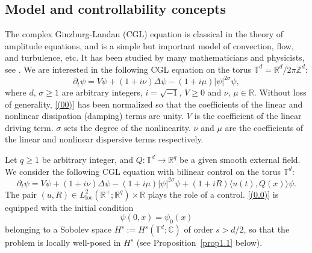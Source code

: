 \documentclass[review]{elsarticle}
\theoremstyle{dotless}
\def\R {\mathbb{R}}
\def \geq{\geqslant}
\numberwithin{equation}{section}
\begin{document}
\subsection{Model and controllability concepts}
The complex Ginzburg-Landau (CGL) equation is classical in the theory of amplitude equations, and is a simple but important model of convection, flow, and turbulence, etc. It has been studied by many mathematicians and physicists, see \cite{GL,NewellWhitehead,Segel,SteStu}.
We are interested in the following CGL equation  on the torus $\mathbb{T}^d=\mathbb{R}^d / 2 \pi \mathbb{Z}^d$:
\begin{equation}\label{(00)}
\partial_t \psi=V \psi+(1+i \nu) \Delta \psi-(1+i \mu)|\psi|^{2 \sigma} \psi,
\end{equation}where $d,\, \sigma \geq 1$ are arbitrary integers, $i=\sqrt{-1}$, $V\geq0$ and  $\nu,\, \mu\in \R$.
Without loss of generality, \eqref{(00)} has been normalized so that the coefficients of the linear and nonlinear dissipation (damping) terms are unity. $V$ is the coefficient of the linear driving term. $\sigma$ sets the degree of the nonlinearity. $\nu$ and $\mu$ are the coefficients of the linear and nonlinear dispersive terms respectively.

Let $ q \geq 1$ be arbitrary integer, and  $Q: \mathbb{T}^d \rightarrow \mathbb{R}^q$ be a given smooth external field. We consider the following CGL equation with bilinear control on the torus $\mathbb{T}^d$:
\begin{equation} \label{(0.0)}
	\partial_t \psi=V \psi+(1+i \nu) \Delta \psi-(1+i \mu)|\psi|^{2 \sigma} \psi +(1+i R) \langle u(t), Q(x)\rangle \psi .
\end{equation}
The pair $ (u,R)\in L^2_{\text{loc}}(\R^+;\R^{q})\times\R$ plays the role of a control. 
\eqref{(0.0)} is equipped with the initial condition
\begin{equation}\label{(0.2)}
\psi(0, x)=\psi_0(x)
\end{equation}
belonging to a Sobolev space $H^s:=H^s\left(\mathbb{T}^d ; \mathbb{C}\right)$ of order $s>d / 2$, so that the problem is locally well-posed in $H^s$ (see Proposition~\ref{prop1.1} below). 
\end{document}
